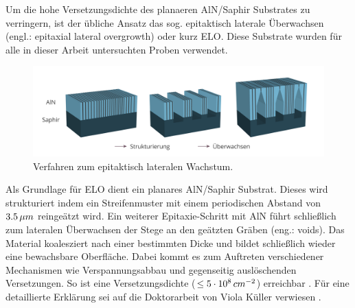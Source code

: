 Um die hohe Versetzungsdichte des planaeren AlN/Saphir Substrates zu verringern, ist der übliche Ansatz das sog. epitaktisch laterale Überwachsen (engl.: epitaxial lateral overgrowth) oder kurz ELO. Diese Substrate wurden für alle in dieser Arbeit untersuchten Proben verwendet. 
\begin{figure}[h]
    \centering
    \begin{minipage}[t]{1\linewidth}
    \centering
    \includegraphics[width=1\linewidth]{Bilder/elostrukturierung.png}
    \end{minipage}%
    \caption{Verfahren zum epitaktisch lateralen Wachstum.}
     \label{fig:IQEthreadingdisl}
\end{figure}
\noindent
Als Grundlage für ELO dient ein planares AlN/Saphir Substrat. Dieses wird strukturiert indem ein Streifenmuster mit einem periodischen Abstand von $3.5 \thinspace \mu m$ reingeätzt wird. Ein weiterer Epitaxie-Schritt mit AlN führt schließlich zum lateralen Überwachsen der Stege an den geätzten Gräben (eng.: voids).
Das Material koalesziert nach einer bestimmten Dicke und bildet schließlich wieder eine bewachsbare Oberfläche. Dabei kommt es zum Auftreten verschiedener Mechanismen wie Verspannungsabbau und gegenseitig auslöschenden Versetzungen. So ist eine Versetzungsdichte ($\leq 5 \cdot 10^8 \thinspace cm^{-2}$) erreichbar \cite{zeimeru} \cite{MOGILATENKO2014222} \cite{vkueller} \cite{IMURA2007257}. Für eine detaillierte Erklärung sei auf die Doktorarbeit von Viola Küller verwiesen \cite{vkueller}.